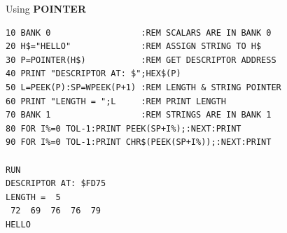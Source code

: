 \begin{description}[leftmargin=2cm,style=nextline]
\item [Example:] Using {\bf POINTER}

\begin{tcolorbox}[colback=black,coltext=white]
\verbatimfont{\codefont}
\begin{verbatim}
10 BANK 0                  :REM SCALARS ARE IN BANK 0
20 H$="HELLO"              :REM ASSIGN STRING TO H$
30 P=POINTER(H$)           :REM GET DESCRIPTOR ADDRESS
40 PRINT "DESCRIPTOR AT: $";HEX$(P)
50 L=PEEK(P):SP=WPEEK(P+1) :REM LENGTH & STRING POINTER
60 PRINT "LENGTH = ";L     :REM PRINT LENGTH
70 BANK 1                  :REM STRINGS ARE IN BANK 1
80 FOR I%=0 TOL-1:PRINT PEEK(SP+I%);:NEXT:PRINT
90 FOR I%=0 TOL-1:PRINT CHR$(PEEK(SP+I%));:NEXT:PRINT

RUN
DESCRIPTOR AT: $FD75
LENGTH =  5
 72  69  76  76  79
HELLO
\end{verbatim}
\end{tcolorbox}
\end{description}


\newpage
